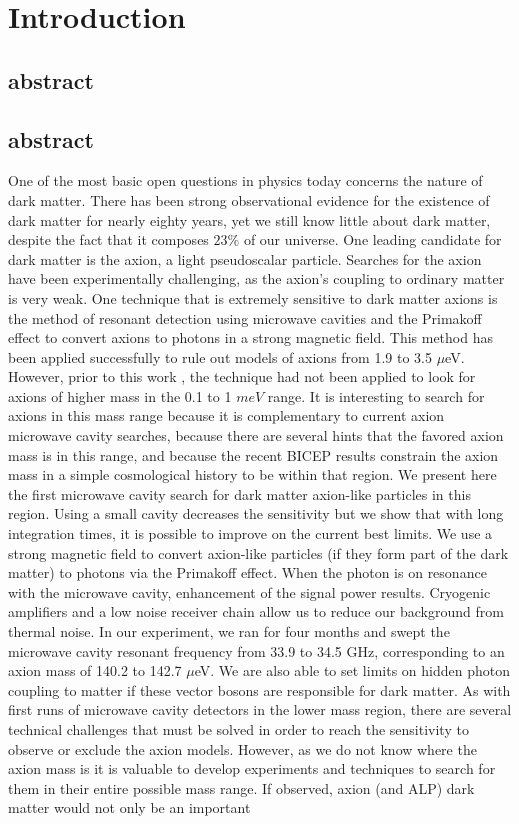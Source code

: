 \documentclass[12pt,twosides]{book}
\begin{document}
\tableofcontents

\chapter{Introduction}

\section{abstract}

\section{abstract}

One of the most basic open questions in physics today concerns the nature of dark matter. There has been strong observational evidence for the existence of dark matter for nearly eighty years, yet we still know little about dark matter, despite the fact that it composes $23\%$ of our universe. One leading candidate for dark matter is the axion, a light pseudoscalar particle. Searches for the axion have been experimentally challenging, as the axion's coupling to ordinary matter is very weak. One technique that is extremely sensitive to dark matter axions is the method of resonant detection using microwave cavities and the Primakoff effect to convert axions to photons in a strong magnetic field. This method has been applied successfully to rule out models of axions from 1.9 to 3.5 $\mu$eV. However, prior to this work , the technique had not been applied to look for axions of higher mass in the 0.1 to 1 $meV$ range. It is interesting to search for axions in this mass range because it is complementary to current axion microwave cavity searches, because there are several hints that the favored axion mass is in this range, and because the recent BICEP results constrain the axion mass in a simple cosmological history to be within that region. We present here the first microwave cavity search for dark matter axion-like particles in this region. Using a small cavity decreases the sensitivity but we show that with long integration times, it is possible to improve on the current best limits. We use a strong magnetic field to convert axion-like particles (if they form part of the dark matter) to photons via the Primakoff effect. When the photon is on resonance with the microwave cavity, enhancement of the signal power results. Cryogenic amplifiers and a low noise receiver chain allow us to reduce our background from thermal noise. In our experiment, we ran for four months and swept the microwave cavity resonant frequency from 33.9 to 34.5 GHz, corresponding to an axion mass of 140.2  to 142.7 $\mu$eV. We are also able to set limits on hidden photon coupling to matter if these vector bosons are responsible for dark matter. As with first runs of microwave cavity detectors in the lower mass region, there are several technical challenges that must be solved in order to reach the sensitivity to observe or exclude the axion models. However, as we do not know where the axion mass is it is valuable to develop experiments and techniques to search for them in their entire possible mass range. If observed, axion (and ALP) dark matter would not only be an important 
\end{document}
